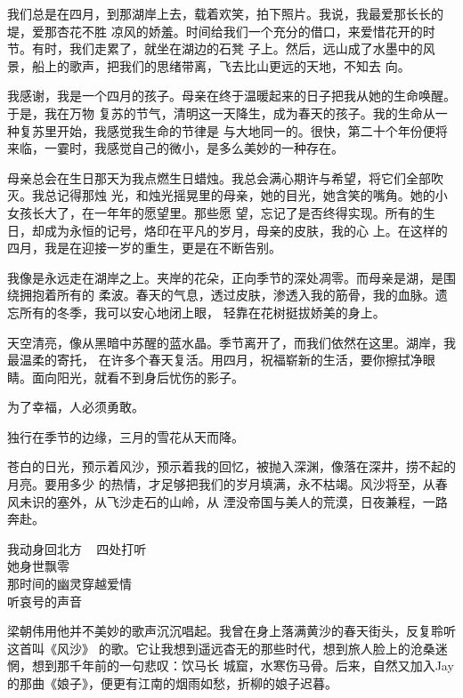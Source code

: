 		我们总是在四月，到那湖岸上去，载着欢笑，拍下照片。我说，我最爱那长长的堤，爱那杏花不胜
	凉风的娇羞。时间给我们一个充分的借口，来爱惜花开的时节。有时，我们走累了，就坐在湖边的石凳
	子上。然后，远山成了水墨中的风景，船上的歌声，把我们的思绪带离，飞去比山更远的天地，不知去
	向。

		我感谢，我是一个四月的孩子。母亲在终于温暖起来的日子把我从她的生命唤醒。于是，我在万物
	复苏的节气，清明这一天降生，成为春天的孩子。我的生命从一种复苏里开始，我感觉我生命的节律是
	与大地同一的。很快，第二十个年份便将来临，一霎时，我感觉自己的微小，是多么美妙的一种存在。

		母亲总会在生日那天为我点燃生日蜡烛。我总会满心期许与希望，将它们全部吹灭。我总记得那烛
	光，和烛光摇晃里的母亲，她的目光，她含笑的嘴角。她的小女孩长大了，在一年年的愿望里。那些愿
	望，忘记了是否终得实现。所有的生日，却成为永恒的记号，烙印在平凡的岁月，母亲的皮肤，我的心
	上。在这样的四月，我是在迎接一岁的重生，更是在不断告别。

		我像是永远走在湖岸之上。夹岸的花朵，正向季节的深处凋零。而母亲是湖，是围绕拥抱着所有的
	柔波。春天的气息，透过皮肤，渗透入我的筋骨，我的血脉。遗忘所有的冬季，我可以安心地闭上眼，
	轻靠在花树挺拔娇美的身上。

		天空清亮，像从黑暗中苏醒的蓝水晶。季节离开了，而我们依然在这里。湖岸，我最温柔的寄托，
	在许多个春天复活。用四月，祝福崭新的生活，要你擦拭净眼睛。面向阳光，就看不到身后忧伤的影子。

		为了幸福，人必须勇敢。

	\endwriting



		独行在季节的边缘，三月的雪花从天而降。

		苍白的日光，预示着风沙，预示着我的回忆，被抛入深渊，像落在深井，捞不起的月亮。要用多少
	的热情，才足够把我们的岁月填满，永不枯竭。风沙将至，从春风未识的塞外，从飞沙走石的山岭，从
	湮没帝国与美人的荒漠，日夜兼程，一路奔赴。

		\longpoem{}{}{}
			我动身回北方 ~ 四处打听 \\
			她身世飘零 \\
			那时间的幽灵穿越爱情 \\
			听哀号的声音
		\endlongpoem

		梁朝伟用他并不美妙的歌声沉沉唱起。我曾在身上落满黄沙的春天街头，反复聆听这首叫《风沙》
	的歌。它让我想到遥远杳无的那些时代，想到旅人脸上的沧桑迷惘，想到那千年前的一句悲叹：饮马长
	城窟，水寒伤马骨。后来，自然又加入Jay的那曲《娘子》，便更有江南的烟雨如愁，折柳的娘子迟暮。

